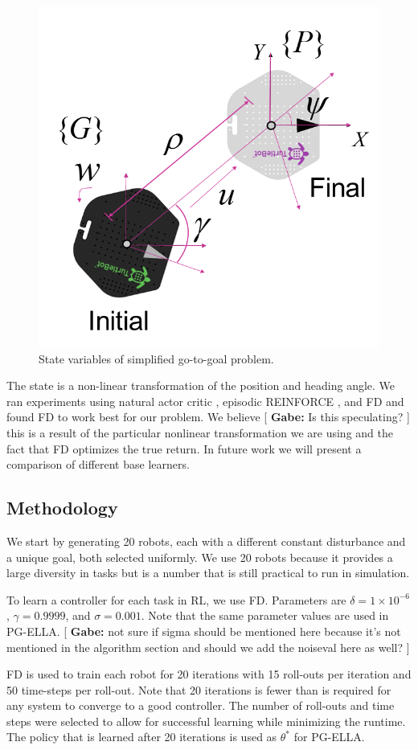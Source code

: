 \documentclass{aamas2016}
\newcommand{\note}[3]{{\color{#2} [ \ding{42} \textbf{#1:} {\small #3} ]}}
\newcommand{\comGabe}[1]{\note{Gabe}{cyan}{#1}}
\begin{document}
\begin{figure}[!htbp]
    \centering
        \includegraphics[width=.45\textwidth]{images/unicycle.png}
        \caption{State variables of simplified go-to-goal problem.}\label{fig:numfeat}
\end{figure}
The state is a non-linear transformation of the position and heading angle. We ran experiments using natural actor critic \cite{peters2008natural}, episodic REINFORCE \cite{williams1992simple}, and FD \cite{Bagnell-2013} and found FD to work best for our problem. We believe \comGabe{Is this speculating?} this is a result of the particular nonlinear transformation we are using and the fact that FD optimizes the true return. In future work we will present a comparison of different base learners. 

\subsection{Methodology}
We start by generating 20 robots, each with a different constant disturbance and a unique goal, both selected uniformly. 
We use 20 robots because it provides a large diversity in tasks but is a number that is still practical to run in simulation. 

To learn a controller for each task in RL, we use FD. Parameters are $\delta=1\times 10^{-6}$, $\gamma=0.9999$, and $\sigma=0.001$. 
Note that the same parameter values are used in PG-ELLA.\comGabe{not sure if sigma should be mentioned here because it's not mentioned in the algorithm section and should we add the noiseval here as well?}

FD is used to train each robot for 20 iterations with 15 roll-outs per iteration and 50 time-steps per roll-out.
Note that 20 iterations is fewer than is required for any system to converge to a good controller. 
The number of roll-outs and time steps were selected to allow for successful learning while minimizing the runtime. 
The policy that is learned after 20 iterations is used as $\theta^*$ for PG-ELLA. %
\end{document}
